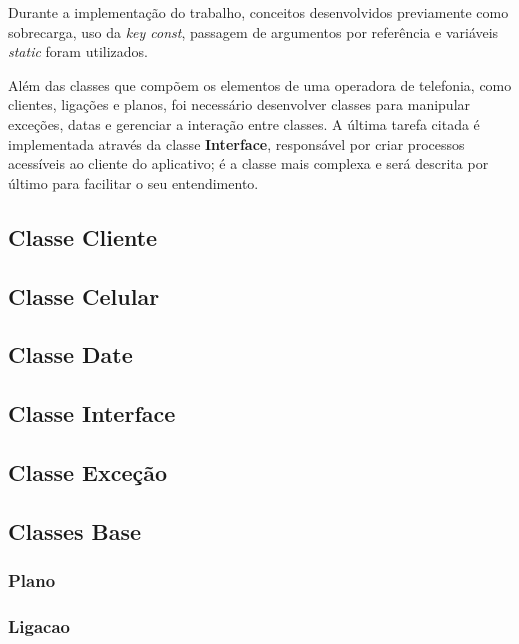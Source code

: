 Durante a implementação do trabalho, conceitos desenvolvidos previamente como sobrecarga, uso da \textit{key const}, passagem de argumentos por referência e variáveis \textit{static} foram utilizados.

Além das classes que compõem os elementos de uma operadora de telefonia, como clientes, ligações e planos, foi necessário desenvolver classes para manipular exceções, datas e gerenciar a interação entre classes. A última tarefa citada é implementada através da classe \textbf{Interface}, responsável por criar processos acessíveis ao cliente do aplicativo; é a classe mais complexa e será descrita por último para facilitar o seu entendimento.

\subsection{Classe Cliente}





\subsection{Classe Celular}

\subsection{Classe Date}

\subsection{Classe Interface}

\subsection{Classe Exceção}

\subsection{Classes Base}

\subsubsection{Plano}

\subsubsection{Ligacao}

